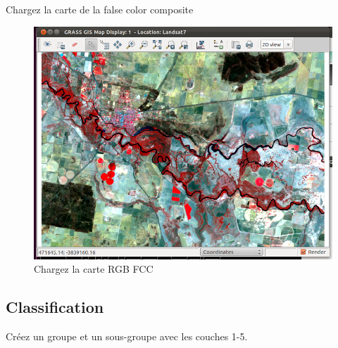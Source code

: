 Chargez la carte de la false color composite

\begin{figure}[htbp]
   \centering
   \includegraphics[scale=0.35]{grass_rs007.png}
   \caption{Chargez la carte RGB FCC}
   \label{fig:grass_rs007}
\end{figure}

\subsection{Classification}
\label{Segmentation}

Cr\'eez un groupe et un sous-groupe avec les couches 1-5.

